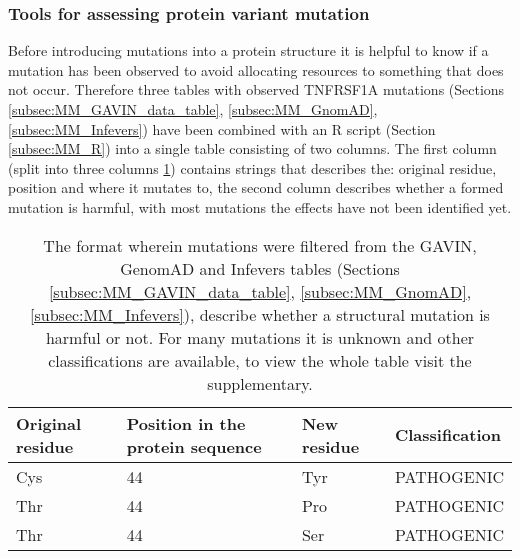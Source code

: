	\subsubsection{Tools for assessing protein variant mutation}
	Before introducing mutations into a protein structure it is helpful to know if a mutation has been observed to avoid allocating resources to something that does not occur. Therefore three tables with observed TNFRSF1A mutations (Sections \ref{subsec:MM_GAVIN_data_table}, \ref{subsec:MM_GnomAD}, \ref{subsec:MM_Infevers}) have been combined with an R script (Section \ref{subsec:MM_R}) into a single table consisting of two columns. The first column (split into three columns \ref{table:Res_Filtered_Mutations}) contains strings that describes the: original residue, position and where it mutates to, the second column describes whether a formed mutation is harmful, with most mutations the effects have not been identified yet. 
	\begin{table}[ht]
		\begin{tabular}{ l | l | l | l}
			Original residue & Position in the protein sequence & New residue & Classification\\ \hline
			Cys & 44 & Tyr & PATHOGENIC\\
			Thr & 44 & Pro & PATHOGENIC\\
			Thr & 44 & Ser & PATHOGENIC\\
		\end{tabular}
		\caption[Sample of combined tables with observed mutations]{The format wherein mutations were filtered from the GAVIN, GenomAD and Infevers tables (Sections \ref{subsec:MM_GAVIN_data_table},  \ref{subsec:MM_GnomAD}, \ref{subsec:MM_Infevers}),  describe whether a structural mutation is harmful or not. For many mutations it is unknown and other classifications are available, to view the whole table visit the supplementary.}
		\label{table:Res_Filtered_Mutations}
	\end{table}
	
